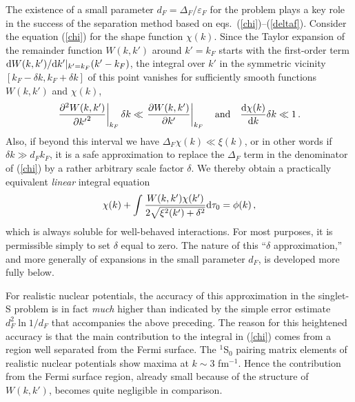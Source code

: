 The existence of a small parameter $d_F=\Delta_F/\varepsilon_F$
for the problem plays a key role in the success of the separation method
based on eqs.~(\ref{chi})--(\ref{deltaf}).  Consider the equation
(\ref{chi}) for the shape function $\chi(k)$. Since the Taylor expansion
of the remainder function $W(k,k')$ around $k'=k_F$ starts with
the first-order term ${\rm d} W(k,k')/{\rm d} k'|_{k'=k_F} (k' - k_F)$,
the integral over $k'$ in the symmetric vicinity
$[k_F - \delta k,k_F + \delta k]$ of this point
vanishes for sufficiently smooth functions $W(k,k')$ and $\chi(k)$,
\begin{equation}
\left.\frac{\partial^2 W(k,k')}{\partial {k'}^2}\right|_{k_F} \delta k \ll
	\left.\frac{\partial W(k,k')}{\partial k'}\right|_{k_F}
\quad \mbox{and} \quad
\frac{{\rm d} \chi(k)}{{\rm d} k} \delta k \ll 1 \, .
\end{equation}
Also, if beyond this interval we have
$\Delta_F \chi(k) \ll \xi(k)$,
or in other words if $\delta k \gg d_Fk_F$,
it is a safe approximation to replace the $\Delta_F$ term in
the denominator of (\ref{chi}) by a rather arbitrary scale factor
$\delta$. We thereby obtain a practically equivalent {\it linear}
integral equation
\begin{equation}
\chi(k) + \int \frac{W(k,k')\chi(k')}
	{2\sqrt{ \xi^2(k')+ \delta^2}}{\rm d}\tau_0 =  \phi(k) \, ,
\end{equation}
which is always soluble for well-behaved interactions.  For most
purposes, it is permissible simply to set $\delta$ equal to zero.
The nature of this ``$\delta$ approximation,'' and more generally
of expansions in the small parameter $d_F$, is developed more
fully below.

For realistic nuclear potentials, the accuracy of this approximation
in the singlet-S problem is in fact {\it much} higher than indicated by
the simple error estimate $d_F^2\ln 1/d_F$ that accompanies the above
preceding.  The reason for this heightened accuracy is that the main
contribution to the integral in (\ref{chi}) comes from a region well 
separated from the Fermi surface.  The $^1$S$_0$ pairing matrix elements 
of realistic nuclear potentials show maxima at $k\sim 3$ fm$^{-1}$.  
Hence the contribution from the Fermi surface region, already small 
because of the structure of $W(k,k')$, becomes quite negligible in 
comparison.

